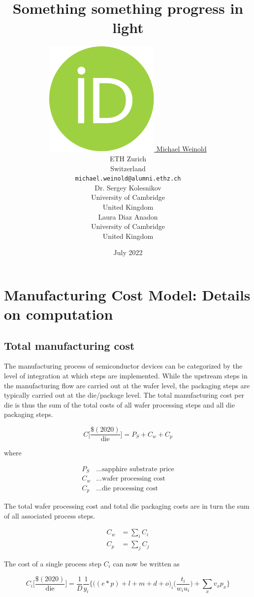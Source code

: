 \documentclass{article}
\title{Something something progress in light}
\date{July 2022}
\author{
    \href{https://orcid.org/0000-0003-4859-2650}
    {\includegraphics[scale=0.06]{2_SSL_EES/article/figures/orcid.pdf}
    \hspace{1mm}
    Michael Weinold} \\
	ETH Zurich\\
    Switzerland \\
	\texttt{michael.weinold@alumni.ethz.ch} \\
	\AND
	Dr. Sergey Kolesnikov\\
	University of Cambridge \\
	United Kingdom \\
    \And
	Laura Diaz Anadon \\
	University of Cambridge \\
	United Kingdom \\
}
\begin{document}
\maketitle

\section{Manufacturing Cost Model: Details on computation}

\subsection{Total manufacturing cost}

The manufacturing process of semiconductor devices can be categorized by the level of integration at which steps are implemented. While the upstream steps in the manufacturing flow are carried out at the wafer level, the packaging steps are typically carried out at the die/package level. The total manufacturing cost per die is thus the sum of the total costs of all wafer processing steps and all die packaging steps.

\begin{equation}
\label{eqn:cost_sum}
    C \bigg[ \frac{ \$(2020) }{ \text{die} } \bigg] = P_S + C_w + C_p
\end{equation}

where

\begin{align*}
    P_S &\dots \text{sapphire substrate price} \\
    C_w &\dots \text{wafer processing cost} \\
    C_p &\dots \text{die processing cost}
\end{align*}

The total wafer processing cost and total die packaging costs are in turn the sum of all associated process steps.

\begin{align}
	C_w &= \sum_i C_i \\
	C_p &= \sum_j C_j
\end{align}

The cost of a single process step $C_i$ can now be written as

\begin{equation}
\label{eqn:cost_wafer}
    C_i \bigg[ \frac{ \$(2020) }{ \text{die} } \bigg] =\frac{1}{D}  \frac{1}{y_i}   \bigg\{ \bigg((e*p) + l + m + d +o \bigg)_i \bigg( \frac{t_i}{w_i u_i} \bigg) + \sum_{x} v_x p_x \bigg\}
\end{equation}
\end{document}
